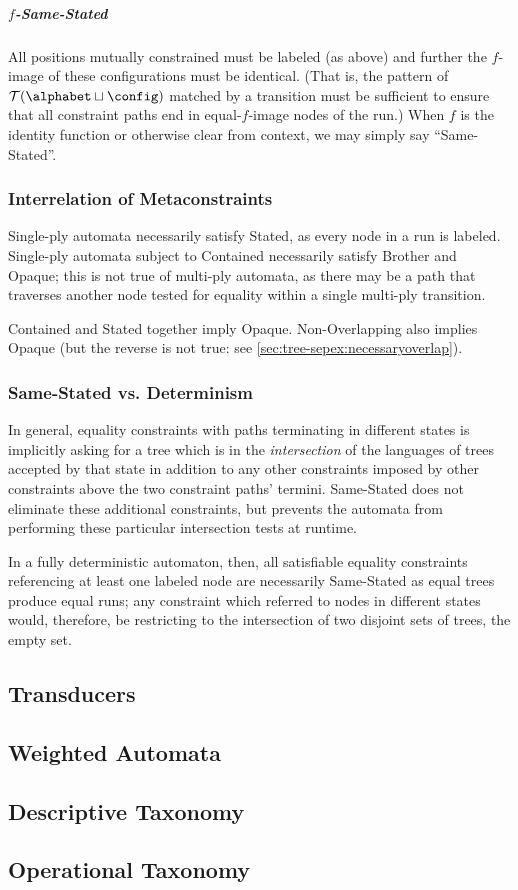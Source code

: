 \subparagraph{$f$-Same-Stated} All positions mutually constrained must be
labeled (as above) and further the $f$-image of these configurations must be
identical.  (That is, the pattern of $\mathcal{T}(\alphabet \sqcup \config)$
matched by a transition must be sufficient to ensure that all constraint
paths end in equal-$f$-image nodes of the run.) When $f$ is the identity
function or otherwise clear from context, we may simply say
``Same-Stated''.

\subsubsection{Interrelation of Metaconstraints}

Single-ply automata necessarily satisfy Stated, as every node in a run is
labeled.  Single-ply automata subject to Contained necessarily satisfy
Brother and Opaque; this is not true of multi-ply automata, as there may be
a path that traverses another node tested for equality within a single
multi-ply transition.

Contained and Stated together imply Opaque.  Non-Overlapping also implies
Opaque (but the reverse is not true: see
\autoref{sec:tree-sepex:necessaryoverlap}).

\subsubsection{Same-Stated vs. Determinism}

In general, equality constraints with paths terminating in different states
is implicitly asking for a tree which is in the {\em intersection} of the
languages of trees accepted by that state in addition to any other
constraints imposed by other constraints above the two constraint paths'
termini.  Same-Stated does not eliminate these additional constraints, but
prevents the automata from performing these particular intersection tests at
runtime.

In a fully deterministic automaton, then, all satisfiable equality
constraints referencing at least one labeled node are necessarily
Same-Stated as equal trees produce equal runs; any constraint which referred
to nodes in different states would, therefore, be restricting to the
intersection of two disjoint sets of trees, \ie the empty set.

\subsection{Transducers}

\subsection{Weighted Automata}

\subsection{Descriptive Taxonomy}

\subsection{Operational Taxonomy}
